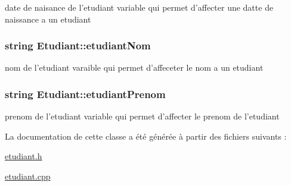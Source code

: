 date de naisance de l'etudiant variable qui permet d'affecter une datte de naissance a un etudiant 

\hypertarget{class_etudiant_a78fe5201de800a14f55e447ca9546735}{
\subsubsection[{etudiant\+Nom}]{\setlength{\rightskip}{0pt plus 5cm}string Etudiant\+::etudiant\+Nom\hspace{0.3cm}{\ttfamily [private]}}}\label{class_etudiant_a78fe5201de800a14f55e447ca9546735}


nom de l'etudiant varaible qui permet d'affeceter le nom a un etudiant 

\hypertarget{class_etudiant_adf6ae4956a327bc5d452f91c317ede35}{
\subsubsection[{etudiant\+Prenom}]{\setlength{\rightskip}{0pt plus 5cm}string Etudiant\+::etudiant\+Prenom\hspace{0.3cm}{\ttfamily [private]}}}\label{class_etudiant_adf6ae4956a327bc5d452f91c317ede35}


prenom de l'etudiant variable qui permet d'affecter le prenom de l'etudiant 



La documentation de cette classe a été générée à partir des fichiers suivants \+:\begin{DoxyCompactItemize}
\item 
\hyperlink{etudiant_8h}{etudiant.\+h}\item 
\hyperlink{etudiant_8cpp}{etudiant.\+cpp}\end{DoxyCompactItemize}
